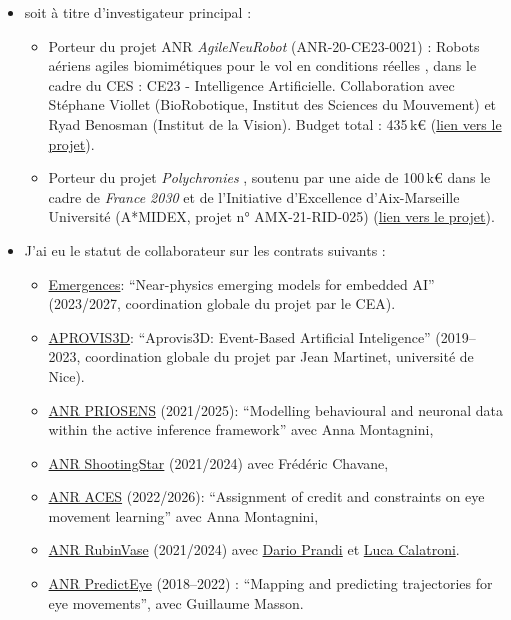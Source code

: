 \documentclass[10pt,french,a4paper]{article}%
\begin{document}
\begin{itemize}
\item soit à titre d'investigateur principal :
\begin{itemize}

	\item Porteur du projet ANR \og \textit{AgileNeuRobot} \fg{} (ANR-20-CE23-0021) : \og Robots aériens agiles biomimétiques pour le vol en conditions réelles \fg{}, dans le cadre du CES : CE23 - Intelligence Artificielle. Collaboration avec Stéphane Viollet (BioRobotique, Institut des Sciences du Mouvement) et Ryad Benosman (Institut de la Vision). Budget total : 435\,k€ (\href{https://laurentperrinet.github.io/grant/anr-anr/}{lien vers le projet}).

	\item Porteur du projet \og \textit{Polychronies} \fg{}, soutenu par une aide de 100\,k€ dans le cadre de \textit{France 2030} et de l’Initiative d’Excellence d’Aix-Marseille Université (A*MIDEX, projet n° AMX-21-RID-025) (\href{https://laurentperrinet.github.io/grant/polychronies/}{lien vers le projet}).
\end{itemize}
\item J'ai eu le statut de collaborateur sur les contrats suivants :
\begin{itemize}
	\item  \href{https://laurentperrinet.github.io/grant/emergences/}{Emergences}: ``Near-physics emerging models for embedded AI'' (2023/2027, coordination globale du projet par le CEA).
	\item  \href{https://laurentperrinet.github.io/grant/aprovis-3-d/}{APROVIS3D}: ``Aprovis3D: Event-Based Artificial Inteligence'' (2019--2023, coordination globale du projet par Jean Martinet, université de Nice).
 	\item \href{https://laurentperrinet.github.io/grant/anr-priosens/}{ANR PRIOSENS} (2021/2025): ``Modelling behavioural and neuronal data within the active inference framework'' avec Anna Montagnini,
 	 \item \href{https://laurentperrinet.github.io/grant/anr-shootingstar/}{ANR ShootingStar} (2021/2024) avec Frédéric Chavane,
	  \item \href{https://laurentperrinet.github.io/grant/anr-aces/}{ANR ACES} (2022/2026): ``Assignment of credit and constraints on eye movement learning'' avec Anna Montagnini,
	  \item \href{https://laurentperrinet.github.io/grant/anr-rubinvase/}{ANR RubinVase} (2021/2024) avec \href{https://scholar.google.com/citations?user=22p8Wc4AAAAJ}{Dario Prandi} et \href{https://scholar.google.com/citations?user=dRVPKmkAAAAJ}{Luca Calatroni}.
	  \item \href{https://laurentperrinet.github.io/grant/anr-predicteye/}{ANR PredictEye} (2018--2022) : ``Mapping and predicting trajectories for eye movements'', avec Guillaume Masson.

\end{itemize}
\end{itemize}
\end{document}
